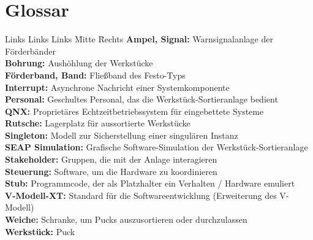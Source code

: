 \documentclass[oneside,a4paper,titlepage]{scrartcl}              %
\begin{document}
\newpage

\section{Glossar}
\begin{tabbing}
  Links Links Links \= Mitte \= Rechts \kill
  \textbf{Ampel, Signal:}    \> \> Warnsignalanlage der Förderbänder\\
  \textbf{Bohrung:}          \> \> Aushöhlung der Werkstücke\\
  \textbf{Förderband, Band:} \> \> Fließband des Festo-Typs\\
  \textbf{Interrupt:}        \> \> Asynchrone Nachricht einer Systemkomponente\\
  \textbf{Personal:}         \> \> Geschultes Personal, das die Werkstück-Sortieranlage bedient\\
  \textbf{QNX:}              \> \> Proprietäres Echtzeitbetriebssystem für eingebettete Systeme\\
  \textbf{Rutsche:}          \> \> Lagerplatz für aussortierte Werkstücke\\
  \textbf{Singleton:}        \> \> Modell zur Sicherstellung einer singulären Instanz\\
  \textbf{SEAP Simulation:}  \> \> Grafische Software-Simulation der Werkstück-Sortieranlage\\
  \textbf{Stakeholder:}      \> \> Gruppen, die mit der Anlage interagieren\\
  \textbf{Steuerung:}        \> \> Software, um die Hardware zu koordinieren\\
  \textbf{Stub:}             \> \> Programmcode, der als Platzhalter ein Verhalten / Hardware emuliert\\
  \textbf{V-Modell-XT:}      \> \> Standard für die Softwareentwicklung (Erweiterung des V-Modell)\\
  \textbf{Weiche:}           \> \> Schranke, um Pucks auszusortieren oder durchzulassen\\
  \textbf{Werkstück:}        \> \> Puck\\
\end{tabbing}


\end{document}
